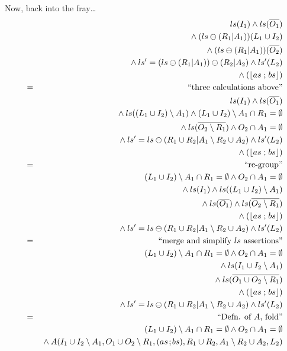 Now, back into the fray\dots
\begin{eqnarray*}
  && ls(I_1)  \land ls(\overline{O_1})
\\&& {}\land (ls\ominus(R_1|A_1))(L_1 \cup I_2)
\\&& {}\land (ls\ominus(R_1|A_1))(\overline{O_2})
\\&& {}\land ls' = (ls\ominus(R_1|A_1))\ominus(R_2|A_2) \land ls'(L_2)
\\&& {}\land (\lfloor as \mathrel{;} bs\rfloor)
\\&=&\textrm{``three calculations above''}
\\&& ls(I_1)  \land ls(\overline{O_1})
\\&& {}\land ls((L_1 \cup I_2)\setminus A_1)
       \land (L_1 \cup I_2)\setminus A_1 \cap R_1 = \emptyset
\\&& {}\land ls(\overline{O_2\setminus R_1})
       \land O_2 \cap A_1 = \emptyset
\\&& {}\land ls' = ls\ominus(R_1 \cup R_2| A_1\setminus R_2 \cup A_2)
       \land ls'(L_2)
\\&& {}\land (\lfloor as \mathrel{;} bs\rfloor)
\\&=&\textrm{``re-group''}
\\&& (L_1 \cup I_2)\setminus A_1 \cap R_1 = \emptyset
     \land O_2 \cap A_1 = \emptyset
\\&& {}\land ls(I_1)
       \land ls((L_1 \cup I_2)\setminus A_1)
\\&& {}\land ls(\overline{O_1})
       \land ls(\overline{O_2\setminus R_1})
\\&& {}\land (\lfloor as \mathrel{;} bs\rfloor)
\\&& {}\land ls' = ls\ominus(R_1 \cup R_2| A_1\setminus R_2 \cup A_2)
       \land ls'(L_2)
\\&=&\textrm{``merge  and simplify $ls$ assertions''}
\\&& (L_1 \cup I_2)\setminus A_1 \cap R_1 = \emptyset
     \land O_2 \cap A_1 = \emptyset
\\&& {}\land ls(I_1 \cup I_2\setminus A_1)
\\&& {}\land ls(\overline{O_1 \cup O_2\setminus R_1})
\\&& {}\land (\lfloor as \mathrel{;} bs\rfloor)
\\&& {}\land ls' = ls\ominus(R_1 \cup R_2| A_1\setminus R_2 \cup A_2)
       \land ls'(L_2)
\\&=&\textrm{``Defn. of $A$, fold''}
\\&& (L_1 \cup I_2)\setminus A_1 \cap R_1 = \emptyset
     \land O_2 \cap A_1 = \emptyset
\\&& {}\land A( I_1 \cup I_2\setminus A_1
              , O_1 \cup O_2\setminus R_1
              , (as\!\mathrel{;}\! bs)
              , R_1 \cup R_2
              , A_1\setminus R_2 \cup A_2
              , L_2 )
\end{eqnarray*}

